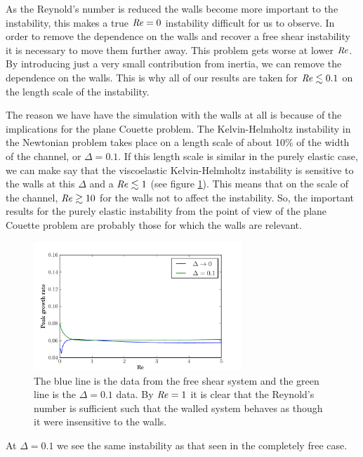 \documentclass{jfm}
\newcommand\Rey{\mbox{\textit{Re}}}  %
\begin{document}
As the Reynold's number is reduced the walls become more important to the
instability, this makes a true $\Rey = 0$ instability difficult for us to
observe. In order to remove the dependence on the walls and recover a free
shear instability it is necessary to move them further away. This problem gets
worse at lower $\Rey$.  By introducing just a very small contribution from
inertia, we can remove the dependence on the walls. This is why all of our
results are taken for $\Rey \lesssim 0.1$ on the length scale of the
instability.

The reason we have have the simulation with the walls at all is because of the
implications for the plane Couette problem. The Kelvin-Helmholtz instability in
the Newtonian problem takes place on a length scale of about 10\% of the width
of the channel, or $\Delta = 0.1$. If this length scale is similar in the
purely elastic case, we can make say that the viscoelastic Kelvin-Helmholtz
instability is sensitive to the walls at this $\Delta$ and a $\Rey \lesssim 1$
(see figure \ref{fig:vary_Re_delta_conv}). This means that on the scale of the
channel, $\Rey \gtrsim 10$ for the walls not to affect the instability. So, the
important results for the purely elastic instability from the point of view of
the plane Couette problem are probably those for which the walls are relevant. 

\begin{figure} \centering
    \includegraphics[width=0.7\textwidth]{vary_Re_delta_conv} \caption{ The
	blue line is the data from the free shear system and the green line is
	the $\Delta = 0.1$ data. By $\Rey = 1$ it is clear that the Reynold's
	number is sufficient such that the walled system behaves as though it
    were insensitive to the walls.  } \label{fig:vary_Re_delta_conv}
\end{figure}

At $\Delta = 0.1$ we see the same instability as that seen in the completely
free case. 
\end{document}
